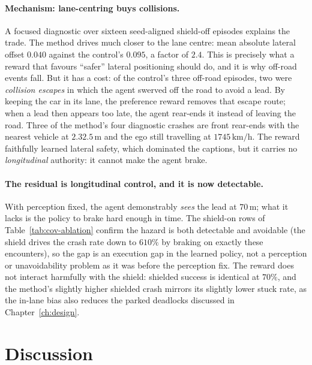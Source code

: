 \paragraph{Mechanism: lane-centring buys collisions.} A focused diagnostic over sixteen
seed-aligned shield-off episodes explains the trade. The method drives much closer to the lane
centre: mean absolute lateral offset \(0.040\) against the control's \(0.095\), a factor of
\(2.4\). This is precisely what a reward that favours ``safer'' lateral positioning should do, and
it is why off-road events fall. But it has a cost: of the control's three off-road episodes, two
were \emph{collision escapes} in which the agent swerved off the road to avoid a lead. By keeping
the car in its lane, the preference reward removes that escape route; when a lead then appears too
late, the agent rear-ends it instead of leaving the road. Three of the method's four diagnostic
crashes are front rear-ends with the nearest vehicle at
\(2.3\)\textendash\(2.5\,\mathrm{m}\) and the ego still travelling at
\(17\)\textendash\(45\,\mathrm{km/h}\). The reward faithfully learned lateral safety, which
dominated the captions, but it carries no \emph{longitudinal} authority: it cannot make the agent
brake.

\paragraph{The residual is longitudinal control, and it is now detectable.} With perception
fixed, the agent demonstrably \emph{sees} the lead at \(70\,\mathrm{m}\); what it lacks is the
policy to brake hard enough in time. The shield-on rows of Table~\ref{tab:cov-ablation} confirm
the hazard is both detectable and avoidable (the shield drives the crash rate down to
\(6\)\textendash\(10\%\) by braking on exactly these encounters), so the gap is an execution gap
in the learned policy, not a perception or unavoidability problem as it was before the perception
fix. The reward does not interact harmfully with the shield: shielded success is identical at
\(70\%\), and the method's slightly higher shielded crash mirrors its slightly lower stuck rate,
as the in-lane bias also reduces the parked deadlocks discussed in Chapter~\ref{ch:design}.

\section{Discussion}\label{sec:cov-discussion}


